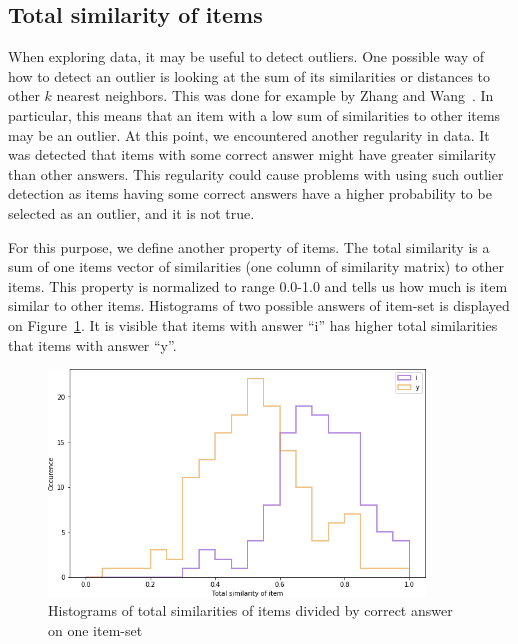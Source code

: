 \documentclass[
  printed, %
  table,   %
  nolof,     %
  nolot,     %
  color,
  final,
  nocover
]{fithesis3}
\begin{document}

\subsection{Total similarity of items}\label{total-similarity-of-items}

When exploring data, it may be useful to detect outliers. One possible way of how to detect an outlier is looking at the sum of its similarities or distances to other $k$ nearest neighbors. This was done for example by Zhang and Wang~\cite{zhang2006detecting}. In particular, this means that an item with a low sum of similarities to other items may be an outlier. At this point, we encountered another regularity in data. It was detected that items with some correct answer might have greater similarity than other answers. This regularity could cause problems with using such outlier detection as items having some correct answers have a higher probability to be selected as an outlier, and it is not true.

For this purpose, we define another property of items. The total similarity is a sum of one items vector of similarities (one column of similarity matrix) to other items. This property is normalized to range 0.0-1.0 and tells us how much is item similar to other items. Histograms of two possible answers of item-set \cviceniB{} is displayed on Figure~\ref{fig:histogram_i_y}. It is visible that items with answer ``i'' has higher total similarities that items with answer ``y''.

\begin{figure}
  \includegraphics[width=10cm]{img/histogram_i_y}
  \caption{Histograms of total similarities of items divided by correct answer on one item-set}
  \label{fig:histogram_i_y}
\end{figure}

\end{document}
